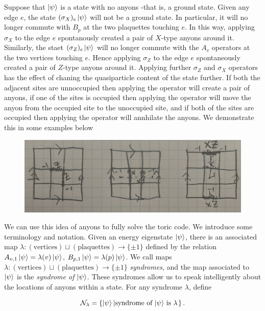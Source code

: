 \documentclass{article}
\theoremstyle{definition}
\numberwithin{figure}{section}
\begin{document}
Suppose that $\ket{\psi}$ is a state with no anyons -that is, a ground state. Given any edge $e$, the state $(\sigma_X)_e \ket{\psi}$ will not be a ground state. In particular, it will no longer commute with $B_p$ at the two plaquettes touching $e$. In this way, applying $\sigma_X$ to the edge $e$ spontanously created a pair of $X$-type anyons around it. Similarly, the staet $(\sigma_Z)_e\ket{\psi}$ will no longer commute with the $A_v$ operators at the two vertices touching $e$. Hence applying $\sigma_Z$ to the edge $e$ spontaneously created a pair of $Z$-type anyons around it. Applying further $\sigma_Z$ and $\sigma_X$ operators has the effect of chaning the quasiparticle content of the state further. If both the adjacent sites are unnoccupied then applying the operator will create a pair of anyons, if one of the sites is occupied then applying the operator will move the anyon from the occupied site to the unoccupied site, and if both of the sites are occupied then applying the operator will annhilate the anyons. We demonstrate this in some examples below

\begin{figure}[h]
\begin{center}
\includegraphics[scale=.04]{anyon-examples}
\end{center}
\end{figure}

We can use this idea of anyons to fully solve the toric code. We introduce some terminology and notation. Given an energy eigenstate $\ket{\psi}$, there is an associated map $\lambda: (\text{vertices})\sqcup (\text{plaquettes})\to \{\pm 1\}$ defined by the relation $A_{v,1}\ket{\psi}=\lambda(v)\ket{\psi}$, $B_{p,1}\ket{\psi}=\lambda(p)\ket{\psi}$. We call maps $\lambda: (\text{vertices})\sqcup (\text{plaquettes})\to \{\pm 1\}$ \textit{syndromes}, and the map associated to $\ket{\psi}$ is the \textit{syndrome of $\ket{\psi}$}. These syndromes allow us to speak intelligently about the locations of anyons within a state. For any syndrome $\lambda$, define

$$\mathcal{N}_\lambda=\left\{\ket{\psi}\left| \text{syndrome of $\ket{\psi}$ is $\lambda$}\right.\right\}.$$
\end{document}
